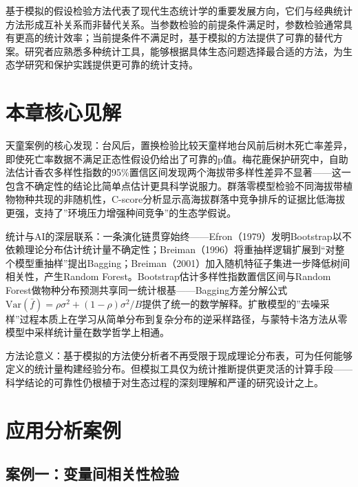 \documentclass[
  twoside,12pt,fontset=none]{ctexbook}
\begin{document}
基于模拟的假设检验方法代表了现代生态统计学的重要发展方向，它们与经典统计方法形成互补关系而非替代关系。当参数检验的前提条件满足时，参数检验通常具有更高的统计效率；当前提条件不满足时，基于模拟的方法提供了可靠的替代方案。研究者应熟悉多种统计工具，能够根据具体生态问题选择最合适的方法，为生态学研究和保护实践提供更可靠的统计支持。

\hypertarget{ux672cux7ae0ux6838ux5fc3ux89c1ux89e3-5}{%
\section{本章核心见解}\label{ux672cux7ae0ux6838ux5fc3ux89c1ux89e3-5}}

天童案例的核心发现：台风后，置换检验比较天童样地台风前后树木死亡率差异，即使死亡率数据不满足正态性假设仍给出了可靠的p值。梅花鹿保护研究中，自助法估计香农多样性指数的95\%置信区间发现两个海拔带多样性差异不显著------这一包含不确定性的结论比简单点估计更具科学说服力。群落零模型检验不同海拔带植物物种共现的非随机性，C-score分析显示高海拔群落中竞争排斥的证据比低海拔更强，支持了''环境压力增强种间竞争''的生态学假说。

统计与AI的深层联系：一条演化链贯穿始终------Efron（1979）发明Bootstrap以不依赖理论分布估计统计量不确定性；Breiman（1996）将重抽样逻辑扩展到``对整个模型重抽样''提出Bagging；Breiman（2001）加入随机特征子集进一步降低树间相关性，产生Random Forest。Bootstrap估计多样性指数置信区间与Random Forest做物种分布预测共享同一统计根基------Bagging方差分解公式\(\text{Var}(\bar{f}) = \rho\sigma^2 + (1-\rho)\sigma^2/B\)提供了统一的数学解释。扩散模型的''去噪采样''过程本质上在学习从简单分布到复杂分布的逆采样路径，与蒙特卡洛方法从零模型中采样统计量在数学哲学上相通。

方法论意义：基于模拟的方法使分析者不再受限于现成理论分布表，可为任何能够定义的统计量构建经验分布。但模拟工具仅为统计推断提供更灵活的计算手段------科学结论的可靠性仍根植于对生态过程的深刻理解和严谨的研究设计之上。

\hypertarget{ux5e94ux7528ux5206ux6790ux6848ux4f8b-5}{%
\section{应用分析案例}\label{ux5e94ux7528ux5206ux6790ux6848ux4f8b-5}}

\hypertarget{ux6848ux4f8bux4e00ux53d8ux91cfux95f4ux76f8ux5173ux6027ux68c0ux9a8c}{%
\subsection{案例一：变量间相关性检验}\label{ux6848ux4f8bux4e00ux53d8ux91cfux95f4ux76f8ux5173ux6027ux68c0ux9a8c}}
\end{document}

